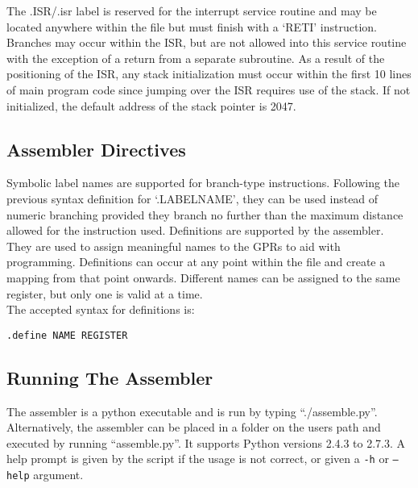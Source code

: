 \noindent The .ISR/.isr label is reserved for the interrupt service routine and may be located anywhere within the file but must finish with a `RETI' instruction. Branches may occur within the ISR, but are not allowed into this service routine with the exception of a return from a separate subroutine. As a result of the positioning of the ISR, any stack initialization must occur within the first 10 lines of main program code since jumping over the ISR requires use of the stack. If not initialized, the default address of the stack pointer is 2047. \\

\subsection{Assembler Directives}
Symbolic label names are supported for branch-type instructions. Following the previous syntax definition for `.LABELNAME', they can be used instead of numeric branching provided they branch no further than the maximum distance allowed for the instruction used. 
Definitions are supported by the assembler. 
They are used to assign meaningful names to the GPRs to aid with programming.
Definitions can occur at any point within the file and create a mapping from that point onwards. 
Different names can be assigned to the same register, but only one is valid at a time. \\


\noindent The accepted syntax for definitions is:

\begin{center}\texttt{.define NAME REGISTER}\end{center}

\subsection{Running The Assembler}\label{sect:runningassembler}

The assembler is a python executable and is run by typing ``./assemble.py''. 
Alternatively, the assembler can be placed in a folder on the users path and executed by running ``assemble.py''.
It supports Python versions 2.4.3 to 2.7.3.
A help prompt is given by the script if the usage is not correct, or given a \texttt{-h} or \texttt{--help} argument. 

